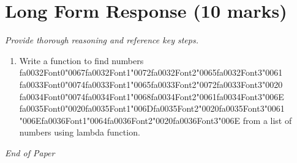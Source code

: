 \documentclass[12pt]{article}
\begin{document}
\section*{Long Form Response (10 marks)}
\textit{Provide thorough reasoning and reference key steps.}
\begin{enumerate}[label=\arabic*.]
\item Write a function to find numbers {\csname fa0032Font0\endcsname\char"0067}{\csname fa0032Font1\endcsname\char"0072}{\csname fa0032Font2\endcsname\char"0065}{\csname fa0032Font3\endcsname\char"0061} {\csname fa0033Font0\endcsname\char"0074}{\csname fa0033Font1\endcsname\char"0065}{\csname fa0033Font2\endcsname\char"0072}{\csname fa0033Font3\endcsname\char"0020} {\csname fa0034Font0\endcsname\char"0074}{\csname fa0034Font1\endcsname\char"0068}{\csname fa0034Font2\endcsname\char"0061}{\csname fa0034Font3\endcsname\char"006E} {\csname fa0035Font0\endcsname\char"0020}{\csname fa0035Font1\endcsname\char"006D}{\csname fa0035Font2\endcsname\char"0020}{\csname fa0035Font3\endcsname\char"0061} {\char"006E}{\csname fa0036Font1\endcsname\char"0064}{\csname fa0036Font2\endcsname\char"0020}{\csname fa0036Font3\endcsname\char"006E} from a list of numbers using lambda
function.
\end{enumerate}

\vfill
\noindent\textit{End of Paper}
\end{document}
